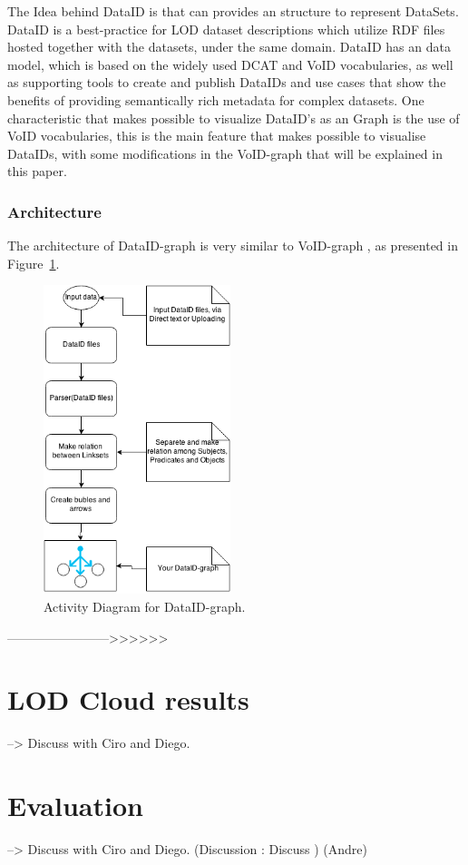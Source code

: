 \documentclass{iosart2c}
\begin{document}
The Idea behind DataID \cite{dataID2014} is that can provides an structure to represent DataSets.
DataID is a best-practice for LOD dataset descriptions which utilize RDF files hosted together with the datasets, under the same domain. 
DataID has an data model, which is based on the widely used DCAT and VoID vocabularies, as well as supporting tools to create and publish DataIDs and use cases that show the benefits of providing semantically rich metadata for complex datasets.
One characteristic that makes possible to visualize DataID's as an Graph is the use of VoID vocabularies, this is the main feature that makes possible to visualise DataIDs, with some modifications in the VoID-graph \cite{Voidgraph} that will be explained in this paper.


\subsubsection{Architecture}
The architecture of DataID-graph is very similar to VoID-graph  \cite{Voidgraph}, as presented in Figure~\ref{fig:dataidgraph}.

\begin{figure}[t]
 \centering
\includegraphics[height=9cm]{img/DataID-Graph.png}
  \caption{Activity Diagram for DataID-graph.}
  \label{fig:dataidgraph}
\end{figure}
------------------------>>>>>>

\section{LOD Cloud results}
--> Discuss with Ciro and Diego.

\section{Evaluation}
--> Discuss with Ciro and Diego.
(Discussion : Discuss ) (Andre)
\end{document}
